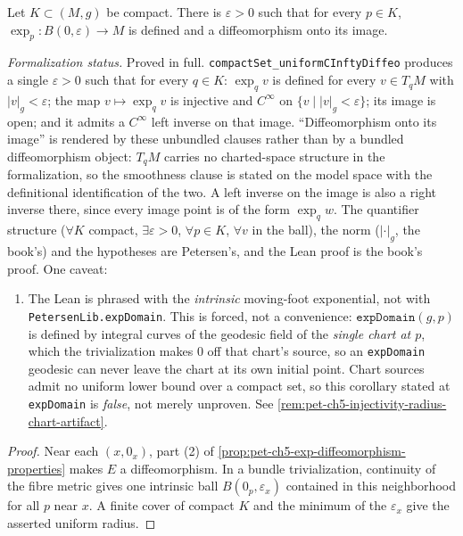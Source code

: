 \begin{corollary}
  \label{cor:pet-ch5-uniform-injectivity-radius-compact}


  Let $K\subset(M,g)$ be compact. There is $\varepsilon>0$ such that for every
  $p\in K$, $\exp_p:B(0,\varepsilon)\to M$ is defined and a diffeomorphism onto its
  image.

  \emph{Formalization status.} Proved in full.
  \texttt{compactSet\_uniformCInftyDiffeo} produces a single $\varepsilon>0$ such
  that for every $q\in K$: $\exp_q v$ is defined for every $v\in T_qM$ with
  $|v|_g<\varepsilon$; the map $v\mapsto\exp_q v$ is injective and $C^\infty$ on
  $\{v\mid|v|_g<\varepsilon\}$; its image is open; and it admits a $C^\infty$ left
  inverse on that image.  ``Diffeomorphism onto its image'' is rendered by these
  unbundled clauses rather than by a bundled diffeomorphism object: $T_qM$ carries
  no charted-space structure in the formalization, so the smoothness clause is
  stated on the model space with the definitional identification of the two.  A
  left inverse on the image is also a right inverse there, since every image point
  is of the form $\exp_q w$.  The quantifier structure ($\forall K$ compact,
  $\exists\varepsilon>0$, $\forall p\in K$, $\forall v$ in the ball), the norm
  ($|\cdot|_g$, the book's) and the hypotheses are Petersen's, and the Lean proof is
  the book's proof.  One caveat:
  \begin{enumerate}
    \item The Lean is phrased with the \emph{intrinsic} moving-foot exponential,
      not with \texttt{PetersenLib.expDomain}.  This is forced, not a convenience:
      $\texttt{expDomain}(g,p)$ is defined by integral curves of the geodesic field
      of the \emph{single chart at $p$}, which the trivialization makes $0$ off
      that chart's source, so an \texttt{expDomain} geodesic can never leave the
      chart at its own initial point.  Chart sources admit no uniform lower bound
      over a compact set, so this corollary stated at \texttt{expDomain} is
      \emph{false}, not merely unproven.  See
      \cref{rem:pet-ch5-injectivity-radius-chart-artifact}.
  \end{enumerate}
\end{corollary}
\begin{proof}

  \sketch
  Near each $(x,0_x)$, part (2) of
  \cref{prop:pet-ch5-exp-diffeomorphism-properties} makes $E$ a diffeomorphism.
  In a bundle trivialization, continuity of the fibre metric gives one intrinsic
  ball $B(0_p,\varepsilon_x)$ contained in this neighborhood for all $p$ near $x$.
  A finite cover of compact $K$ and the minimum of the $\varepsilon_x$ give the
  asserted uniform radius.
\end{proof}


